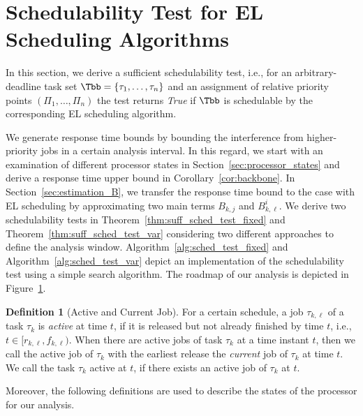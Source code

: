 \documentclass[conference]{IEEEtran}
\theoremstyle{definition}
\newtheorem{defn}[thm]{Definition}
\theoremstyle{remark}
\begin{document}
\section{Schedulability Test for EL Scheduling Algorithms}
\label{sec:test}
	
\begin{figure}[omitted: a diagram of this paper's results, not reproduced here]\label{fig:roadmap}\end{figure}
	
In this section, we derive a sufficient schedulability test, i.e., for an arbitrary-deadline task set $\Tbb = \{ \tau_1 , \dots, \tau_n\}$ and an assignment of relative priority points $(\Pi_1, \dots, \Pi_n)$ the test returns \emph{True} if $\Tbb$ is schedulable by the corresponding EL scheduling algorithm.
	
We generate response time bounds by bounding the interference from higher-priority jobs in a certain analysis interval.
In this regard, we start with an examination of different processor states in Section~\ref{sec:processor_states} and derive a response time upper bound in Corollary~\ref{cor:backbone}.
In Section~\ref{sec:estimation_B}, we transfer the response time bound to the case with EL scheduling by approximating two main terms $B_{k,j}$ and $B^i_{k,\ell}$.
We derive two schedulability tests in Theorem~\ref{thm:suff_sched_test_fixed} and Theorem~\ref{thm:suff_sched_test_var} considering two different approaches to define the analysis window.
Algorithm~\ref{alg:sched_test_fixed} and Algorithm~\ref{alg:sched_test_var} depict an implementation of the schedulability test using a simple search algorithm.
The roadmap of our analysis is depicted in Figure~\ref{fig:roadmap}.
	

\begin{defn}[Active and Current Job]
For a certain schedule, a job $\tau_{k,\ell}$ of a task $\tau_k$ is \emph{active} at time $t$,
if it is released but not already finished by time $t$, i.e., $t \in [r_{k,\ell}, f_{k,\ell})$.
When there are active jobs of task $\tau_k$ at a time instant $t$, then we call the active job of $\tau_k$ with the earliest release the
\emph{current}
job of $\tau_k$ at time $t$.
We call the task $\tau_k$ active at $t$, if there exists an active job of $\tau_k$ at $t$.
\end{defn}

Moreover, the following definitions are used to describe the states of the processor for our analysis.
\end{document}
